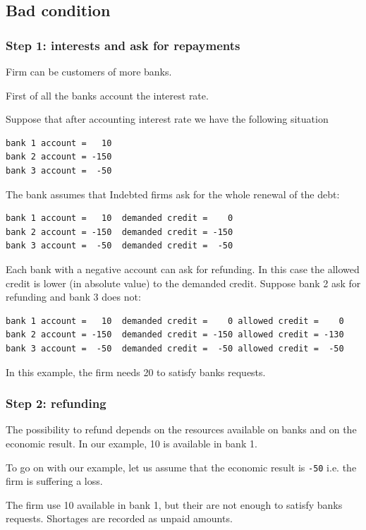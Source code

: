 \documentclass{article}
\begin{document}
\subsection{Bad condition}
\subsubsection*{Step 1: interests and ask for repayments}
Firm can be customers of more banks.

First of all the banks account the interest rate.

Suppose that after accounting interest rate we have the following situation
\begin{verbatim}
bank 1 account =   10
bank 2 account = -150
bank 3 account =  -50
\end{verbatim}

The bank assumes that Indebted firms ask for the whole renewal of the debt:

\begin{verbatim}
bank 1 account =   10  demanded credit =    0
bank 2 account = -150  demanded credit = -150
bank 3 account =  -50  demanded credit =  -50
\end{verbatim}

Each bank with a negative account can ask for refunding. In this case the allowed credit is lower (in absolute value) to the demanded credit.
Suppose bank 2 ask for refunding and bank 3 does not:

\begin{verbatim}
bank 1 account =   10  demanded credit =    0 allowed credit =    0
bank 2 account = -150  demanded credit = -150 allowed credit = -130 
bank 3 account =  -50  demanded credit =  -50 allowed credit =  -50
\end{verbatim}

In this example, the firm needs 20 to satisfy banks requests.

\subsubsection*{Step 2: refunding}

The possibility to refund depends on the resources available on banks and on the economic result. In our example, 10 is available in bank 1.

To go on with our example, let us assume that the economic result is \verb+-50+ i.e. the firm is suffering a loss.

The firm use 10 available in bank 1, but their are not enough to satisfy banks requests. Shortages are recorded as unpaid amounts.
\end{document}
